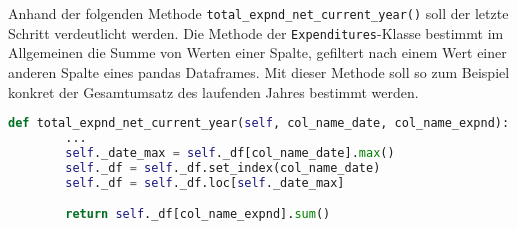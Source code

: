     

        

    

    Anhand der folgenden Methode \texttt{total\_expnd\_net\_current\_year()} soll der letzte Schritt verdeutlicht werden.
    Die Methode der \texttt{Expenditures}-Klasse bestimmt im Allgemeinen die Summe von Werten einer Spalte, gefiltert
    nach einem Wert einer anderen Spalte eines pandas Dataframes. Mit dieser Methode soll so zum Beispiel konkret der Gesamtumsatz des 
    laufenden Jahres bestimmt werden.

    \begin{lstlisting}[language=Python, caption=Beispiel Methode Exenditures class]
    def total_expnd_net_current_year(self, col_name_date, col_name_expnd):
        ... 
        self._date_max = self._df[col_name_date].max()
        self._df = self._df.set_index(col_name_date)
        self._df = self._df.loc[self._date_max]

        return self._df[col_name_expnd].sum()  
    \end{lstlisting}

